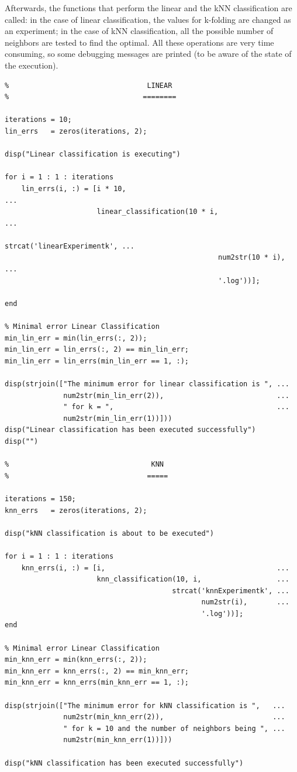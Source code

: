 \documentclass[11pt]{article}
\begin{document}
Afterwards, the functions that perform the linear and the kNN classification are
called: in the case of linear classification, the values for k-folding are
changed as an experiment; in the case of kNN classification, all the possible 
number of neighbors are tested to find the optimal. All these operations are
very time consuming, so some debugging messages are printed (to be aware of the
state of the execution).

\begin{verbatim}
%                                 LINEAR
%                                ========

iterations = 10; 
lin_errs   = zeros(iterations, 2);

disp("Linear classification is executing")

for i = 1 : 1 : iterations
    lin_errs(i, :) = [i * 10,                                           ...
                      linear_classification(10 * i,                     ...
                                            strcat('linearExperimentk', ...
                                                   num2str(10 * i),     ...
                                                   '.log'))];
                      
end

% Minimal error Linear Classification
min_lin_err = min(lin_errs(:, 2));
min_lin_err = lin_errs(:, 2) == min_lin_err;
min_lin_err = lin_errs(min_lin_err == 1, :);

disp(strjoin(["The minimum error for linear classification is ", ...
              num2str(min_lin_err(2)),                           ...
              " for k = ",                                       ...
              num2str(min_lin_err(1))]))
disp("Linear classification has been executed successfully")
disp("")

%                                  KNN
%                                 =====

iterations = 150;
knn_errs   = zeros(iterations, 2); 

disp("kNN classification is about to be executed")

for i = 1 : 1 : iterations
    knn_errs(i, :) = [i,                                         ...
                      knn_classification(10, i,                  ...
                                        strcat('knnExperimentk', ...
                                               num2str(i),       ...
                                               '.log'))];
end

% Minimal error Linear Classification
min_knn_err = min(knn_errs(:, 2));
min_knn_err = knn_errs(:, 2) == min_knn_err;
min_knn_err = knn_errs(min_knn_err == 1, :);

disp(strjoin(["The minimum error for kNN classification is ",   ...
              num2str(min_knn_err(2)),                          ...
              " for k = 10 and the number of neighbors being ", ...
              num2str(min_knn_err(1))]))

disp("kNN classification has been executed successfully")
\end{verbatim}
\end{document}
